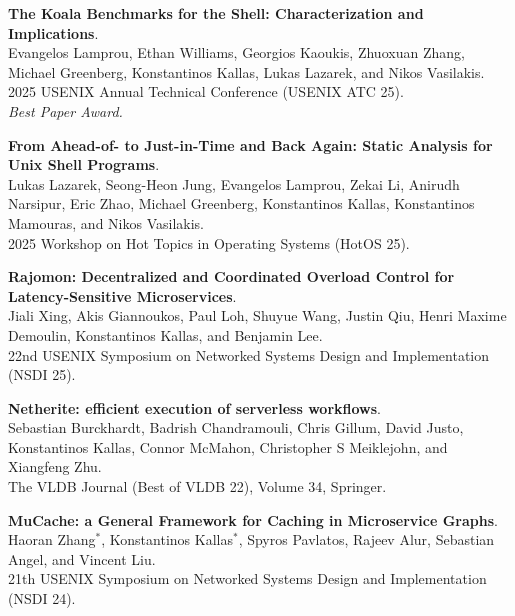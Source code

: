 \begin{minipage}{\textwidth}
\textbf{The Koala Benchmarks for the Shell: Characterization and Implications}. \\
Evangelos Lamprou, Ethan Williams, Georgios Kaoukis, Zhuoxuan Zhang, Michael Greenberg, Konstantinos Kallas, Lukas Lazarek, and Nikos Vasilakis. \\
2025 USENIX Annual Technical Conference (USENIX ATC 25).\\
 \emph{Best Paper Award.}
\end{minipage}

\begin{minipage}{\textwidth}
\textbf{From Ahead-of- to Just-in-Time and Back Again: Static Analysis for Unix Shell Programs}. \\
Lukas Lazarek, Seong-Heon Jung, Evangelos Lamprou, Zekai Li, Anirudh Narsipur, Eric Zhao, Michael Greenberg, Konstantinos Kallas, Konstantinos Mamouras, and Nikos Vasilakis. \\
2025 Workshop on Hot Topics in Operating Systems (HotOS 25).
\end{minipage}

\begin{minipage}{\textwidth}
\textbf{Rajomon: Decentralized and Coordinated Overload Control for Latency-Sensitive Microservices}. \\
Jiali Xing, Akis Giannoukos, Paul Loh, Shuyue Wang, Justin Qiu, Henri Maxime Demoulin, Konstantinos Kallas, and Benjamin Lee. \\
22nd USENIX Symposium on Networked Systems Design and Implementation (NSDI 25).
\end{minipage}

\begin{minipage}{\textwidth}
\textbf{Netherite: efficient execution of serverless workflows}. \\
Sebastian Burckhardt, Badrish Chandramouli, Chris Gillum, David Justo, Konstantinos Kallas, Connor McMahon, Christopher S Meiklejohn, and Xiangfeng Zhu. \\
The VLDB Journal (Best of VLDB 22), Volume 34, Springer.
\end{minipage}

\begin{minipage}{\textwidth}
\textbf{MuCache: a General Framework for Caching in Microservice Graphs}. \\
Haoran Zhang$^*$, Konstantinos Kallas$^*$, Spyros Pavlatos, Rajeev Alur, Sebastian Angel, and Vincent Liu. \\
21th USENIX Symposium on Networked Systems Design and Implementation (NSDI 24).
\end{minipage}

